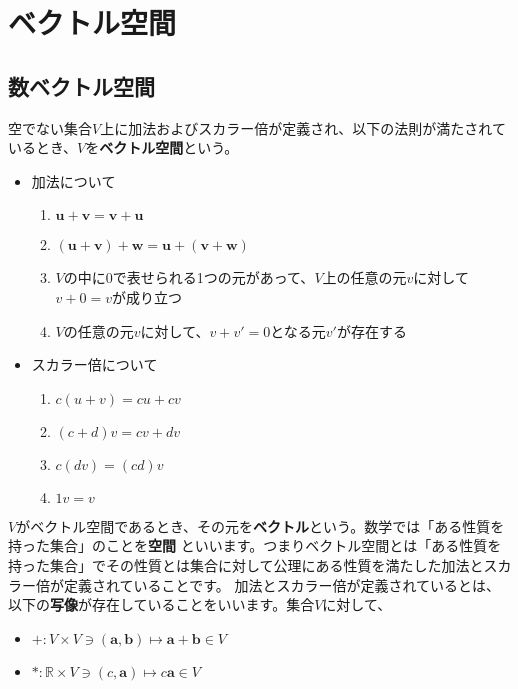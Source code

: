 \documentclass{jlreq}
\begin{document}
\section{ベクトル空間}
\subsection{数ベクトル空間}
\begin{tcolorbox}[enhanced,title=ベクトル空間の公理, 
  attach boxed title to top left, 
  colback=white!95!blue,
  colbacktitle=white!10!blue!50!black,
  drop fuzzy shadow,
  boxrule=0.25mm,
  ]
  空でない集合$V$上に加法およびスカラー倍が定義され、以下の法則が満たされているとき、$V$を\textbf{ベクトル空間}という。

  \begin{itemize}
    \item 加法について
    \begin{enumerate}
      \item $\boldsymbol{u} + \boldsymbol{v} = \boldsymbol{v} + \boldsymbol{u}$
      \item $(\boldsymbol{u} + \boldsymbol{v}) + \boldsymbol{w} = \boldsymbol{u} + (\boldsymbol{v} + \boldsymbol{w})$
      \item $V$の中に0で表せられる1つの元があって、$V$上の任意の元$v$に対して$v + 0 = v$が成り立つ
      \item $V$の任意の元$v$に対して、$v + v' = 0$となる元$v'$が存在する
    \end{enumerate}
    \item スカラー倍について
    \begin{enumerate}
      \item $c(u + v) = cu + cv$
      \item $(c + d)v = cv + dv$
      \item $c(dv) = (cd)v$
      \item $1v = v$
    \end{enumerate}
    \end{itemize}
\end{tcolorbox}

$V$がベクトル空間であるとき、その元を\textbf{ベクトル}という。数学では「ある性質を持った集合」のことを\textbf{空間}
といいます。つまりベクトル空間とは「ある性質を持った集合」でその性質とは集合に対して公理にある性質を満たした加法とスカラー倍が定義されていることです。
加法とスカラー倍が定義されているとは、以下の\textbf{写像}が存在していることをいいます。集合$V$に対して、
\begin{itemize}
  \item $+ :V \times V \ni (\boldsymbol{a}, \boldsymbol{b}) \mapsto \boldsymbol{a} + \boldsymbol{b} \in V$ 
  \item $* : \mathbb{R} \times V \ni (c, \boldsymbol{a}) \mapsto c \boldsymbol{a} \in V$
\end{itemize}
\end{document}
